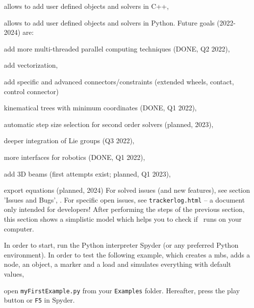   \item allows to add user defined objects and solvers in C++,
  \item allows to add user defined objects and solvers in Python.
\ei
Future goals (2022-2024) are:
\bi
  \item add more multi-threaded parallel computing techniques (DONE, Q2 2022),
  \item add vectorization,
  \item add specific and advanced connectors/constraints (extended wheels, contact, control connector)
  \item kinematical trees with minimum coordinates (DONE, Q1 2022),
  \item automatic step size selection for second order solvers (planned, 2023),
  \item deeper integration of Lie groups (Q3 2022),
  \item more interfaces for robotics (DONE, Q1 2022),
  \item add 3D beams (first attempts exist; planned, Q1 2023),
  \item export equations (planned, 2024)
\ei
For solved issues (and new features), see section 'Issues and Bugs', .
For specific open issues, see \texttt{trackerlog.html} -- a document only intended for developers!
%
After performing the steps of the previous section, this section shows a simplistic model which helps you to check if \codeName\ runs on your computer.

In order to start, run the Python interpreter Spyder (or any preferred Python environment).
In order to test the following example, which creates a \ac{mbs}, adds a node, an object, a marker and a load and simulates everything with default values, 
\bi
{}
\item open \texttt{myFirstExample.py} from your \texttt{Examples} folder.
\ei
Hereafter, press the play button or \texttt{F5} in Spyder.
%

